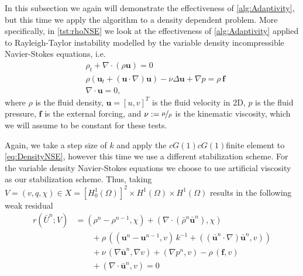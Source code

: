 In this subsection we again will demonstrate the effectiveness of
\autoref{alg:Adaptivity}, but this time we apply the algorithm to a density
dependent problem. More specifically, in \autoref{tst:rhoNSE} we look at the
effectiveness of \autoref{alg:Adaptivity} applied to Rayleigh-Taylor instability
modelled by the variable density incompressible Navier-Stokes equations, i.e.
\begin{equation}
    \begin{split}
        &\rho_t + \nabla \cdot \left( \rho \mathbf{u} \right) = 0 \\
        &\rho \left( \mathbf{u}_t
            + \left( \mathbf{u}\cdot \nabla \right) \mathbf{u} \right)
            - \nu \Delta \mathbf{u} + \nabla p = \rho\, \mathbf{f} \\
        &\nabla \cdot \mathbf{u} = 0,
    \end{split}
    \label{eq:DensityNSE}
\end{equation}
where $\rho$ is the fluid density, $\mathbf{u} = \left[ u, v \right]^T$ is the
fluid velocity in 2D, $p$ is the fluid pressure, $\mathbf{f}$ is the
external forcing, and $\nu := \nicefrac{\mu}{\rho}$ is the kinematic viscosity,
which we will assume to be constant for these tests.

Again, we take a step size of $k$ and apply the $cG(1)cG(1)$finite
element to \autoref{eq:DensityNSE}, however this time we use a different
stabilization scheme. For the variable density Navier-Stokes equations we
choose to use artificial viscosity as our stabilization scheme. Thus, taking
$V = (v, q, \chi) \in X = \left[ H^1_0(\Omega) \right]^2 \times H^1(\Omega)
\times H^1(\Omega)$ results in the following weak residual
\begin{equation}
    \begin{split}
        r(\bar{U}^n; V) &= (\rho^n - \rho^{n-1}, \chi)
            + (\nabla \cdot \left( \bar{\rho}^n \bar{\mathbf{u}}^n \right), \chi) \\
        &\qquad+  \rho\, \left(\left(\mathbf{u}^n
                - \mathbf{u}^{n-1}, v\right)\,k^{-1}
            + (\left( \bar{\mathbf{u}}^n \cdot \nabla \right)
                \bar{\mathbf{u}}^n, v)\right) \\
        &\qquad+ \nu\, (\nabla \bar{\mathbf{u}}^n, \nabla v)
            + (\nabla p^n, v) - \rho\, (\mathbf{f}, v) \\
        &\qquad+ (\nabla \cdot \bar{\mathbf{u}}^n, v) = 0
    \end{split}
    \label{eq:WeakRhoNSE}
\end{equation}


